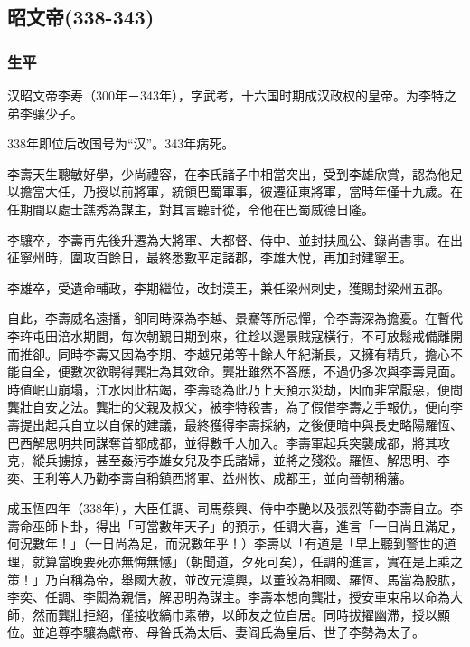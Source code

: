 
\subsection{昭文帝\tiny(338-343)}

\subsubsection{生平}

汉昭文帝李寿（300年－343年），字武考，十六国时期成汉政权的皇帝。为李特之弟李骧少子。

338年即位后改国号为“汉”。343年病死。

李壽天生聰敏好學，少尚禮容，在李氏諸子中相當突出，受到李雄欣賞，認為他足以擔當大任，乃授以前將軍，統領巴蜀軍事，彼遷征東將軍，當時年僅十九歲。在任期間以處士譙秀為謀主，對其言聽計從，令他在巴蜀威德日隆。

李驤卒，李壽再先後升遷為大將軍、大都督、侍中、並封扶風公、錄尚書事。在出征寧州時，圍攻百餘日，最終悉數平定諸郡，李雄大悅，再加封建寧王。

李雄卒，受遺命輔政，李期繼位，改封漢王，兼任梁州刺史，獲賜封梁州五郡。

自此，李壽威名遠播，卻同時深為李越、景騫等所忌憚，令李壽深為擔憂。在暫代李玝屯田涪水期間，每次朝覲日期到來，往趁以邊景賊寇橫行，不可放鬆戒備離開而推卻。同時李壽又因為李期、李越兄弟等十餘人年紀漸長，又擁有精兵，擔心不能自全，便數次欲聘得龔壯為其效命。龔壯雖然不答應，不過仍多次與李壽見面。時值岷山崩塌，江水因此枯竭，李壽認為此乃上天預示災劫，因而非常厭惡，便問龔壯自安之法。龔壯的父親及叔父，被李特殺害，為了假借李壽之手報仇，便向李壽提出起兵自立以自保的建議，最終獲得李壽採納，之後便暗中與長史略陽羅恆、巴西解思明共同謀奪首都成都，並得數千人加入。李壽軍起兵突襲成都，將其攻克，縱兵擄掠，甚至姦污李雄女兒及李氏諸婦，並將之殘殺。羅恆、解思明、李奕、王利等人乃勸李壽自稱鎮西將軍、益州牧、成都王，並向晉朝稱藩。

成玉恆四年（338年），大臣任調、司馬蔡興、侍中李艷以及張烈等勸李壽自立。李壽命巫師卜卦，得出「可當數年天子」的預示，任調大喜，進言「一日尚且滿足，何況數年！」（一日尚為足，而況數年乎！）李壽以「有道是「早上聽到警世的道理，就算當晚要死亦無悔無憾」（朝聞道，夕死可矣），任調的進言，實在是上乘之策！」乃自稱為帝，舉國大赦，並改元漢興，以董皎為相國、羅恆、馬當為股肱，李奕、任調、李閎為親信，解思明為謀主。李壽本想向龔壯，授安車束帛以命為大師，然而龔壯拒絕，僅接收縞巾素帶，以師友之位自居。同時拔擢幽滯，授以顯位。並追尊李驤為獻帝、母昝氏為太后、妻阎氏為皇后、世子李勢為太子。

